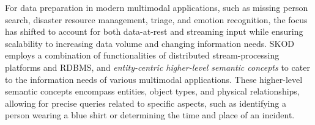 %
For data preparation in modern multimodal applications, such as missing person search, disaster resource management, triage, and emotion recognition, the focus has shifted to account for both data-at-rest and streaming input while ensuring scalability to increasing data volume and changing information needs. 
SKOD \cite{palacios2019wip, stonebraker2020surveillance, solaiman2021applying} employs a combination of functionalities of distributed stream-processing platforms and RDBMS, and \textit{entity-centric higher-level semantic concepts} to cater to the information needs of various multimodal applications. These higher-level semantic concepts encompass entities, object types, and physical relationships, allowing for precise queries related to specific aspects, such as identifying a person wearing a blue shirt or determining the time and place of an incident. 

